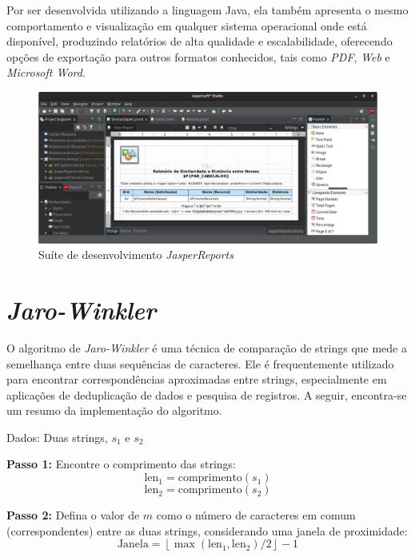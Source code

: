 \documentclass[
	12pt,			%
	openright,		%
	oneside,	
	a4paper,		%
	english,		%
	brazil			%
]{abntex2/abntex2}  %
\begin{document}
			Por ser desenvolvida utilizando a linguagem Java, ela também apresenta o mesmo comportamento e visualização em qualquer sistema operacional onde está disponível, produzindo relatórios de alta qualidade e escalabilidade, oferecendo opções de exportação para outros formatos conhecidos, tais como \textit{PDF}, \textit{Web} e \textit{Microsoft Word}.
			
			\begin{figure}[ht]
				\begin{center}
				
				
				\caption{Suíte de desenvolvimento \textit{JasperReports\textregistered}}
				\label{jasper-img}
				
				\includegraphics[scale=0.35]{img/jaspersoft}
				
				\end{center}
			\end{figure}
			
		\section{\textit{Jaro-Winkler}} \label{jaro-winkler}
		
			O algoritmo de \textit{Jaro-Winkler} \cite{jaro-winkler} é uma técnica de comparação de strings que mede a semelhança entre duas sequências de caracteres. Ele é frequentemente utilizado para encontrar correspondências aproximadas entre strings, especialmente em aplicações de deduplicação de dados e pesquisa de registros. A seguir, encontra-se um resumo da implementação do algoritmo.
			
			Dados: Duas strings, $s_1$ e $s_2$
			
			\noindent
			\textbf{Passo 1:} Encontre o comprimento das strings:
			\[
			\text{len}_1 = \text{comprimento}(s_1)
			\]
			\[
			\text{len}_2 = \text{comprimento}(s_2)
			\]
			
			\noindent
			\textbf{Passo 2:} Defina o valor de $m$ como o número de caracteres em comum (correspondentes) entre as duas strings, considerando uma janela de proximidade:
			\[
			\text{Janela} = \left\lfloor\max(\text{len}_1, \text{len}_2) / 2\right\rfloor - 1
			\]
			
\end{document}
